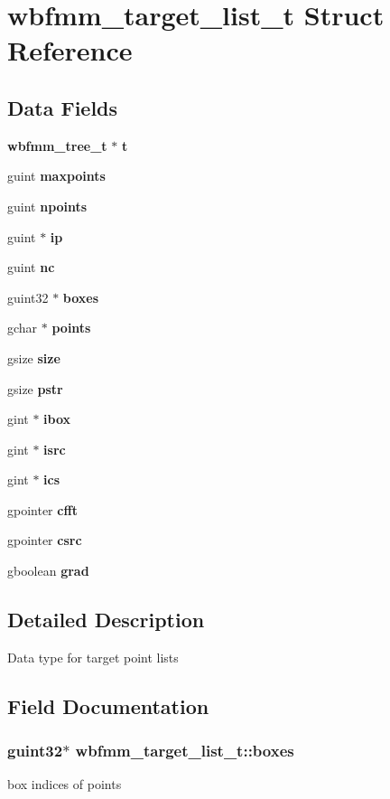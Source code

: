 \section{wbfmm\+\_\+target\+\_\+list\+\_\+t Struct Reference}
\label{structwbfmm__target__list__t}
\subsection*{Data Fields}
\begin{DoxyCompactItemize}
\item 
{\bf wbfmm\+\_\+tree\+\_\+t} $\ast$ {\bf t}
\item 
guint {\bf maxpoints}
\item 
guint {\bf npoints}
\item 
guint $\ast$ {\bf ip}
\item 
guint {\bf nc}
\item 
guint32 $\ast$ {\bf boxes}
\item 
gchar $\ast$ {\bf points}
\item 
gsize {\bf size}
\item 
gsize {\bf pstr}
\item 
gint $\ast$ {\bf ibox}
\item 
gint $\ast$ {\bf isrc}
\item 
gint $\ast$ {\bf ics}
\item 
gpointer {\bf cfft}
\item 
gpointer {\bf csrc}
\item 
gboolean {\bf grad}
\end{DoxyCompactItemize}


\subsection{Detailed Description}
Data type for target point lists 

\subsection{Field Documentation}
\subsubsection[{boxes}]{\setlength{\rightskip}{0pt plus 5cm}guint32$\ast$ wbfmm\+\_\+target\+\_\+list\+\_\+t\+::boxes}\label{structwbfmm__target__list__t_ad41d1c1279c7d7f1eadd3beb086be028}
box indices of points 
